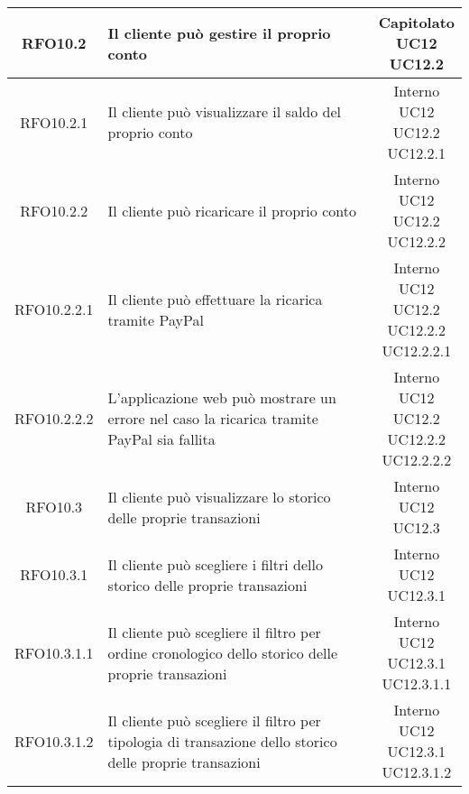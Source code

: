 \begin{longtable}{|c|p{8cm}|c|}
\hypertarget{RFO10.2}{RFO10.2} & Il cliente può gestire il proprio conto &\makecell*{Capitolato\\UC12\\UC12.2} \\
\hline

\hypertarget{RFO10.2.1}{RFO10.2.1} & Il cliente può visualizzare il saldo del proprio conto & \makecell*{Interno\\UC12\\UC12.2\\UC12.2.1} \\
\hline
\hypertarget{RFO10.2.2}{RFO10.2.2} & Il cliente può ricaricare il proprio conto & \makecell*{Interno\\UC12\\UC12.2\\UC12.2.2} \\
\hline

\hypertarget{RFO10.2.2.1}{RFO10.2.2.1} & Il cliente può effettuare la ricarica tramite PayPal & \makecell*{Interno\\UC12\\UC12.2\\UC12.2.2\\UC12.2.2.1} \\
\hline

\hypertarget{RFO10.2.2.2}{RFO10.2.2.2} & L'applicazione web può mostrare un errore nel caso la ricarica tramite PayPal sia fallita & \makecell*{Interno\\UC12\\UC12.2\\UC12.2.2\\UC12.2.2.2} \\
\hline

\hypertarget{RFO10.3}{RFO10.3} & Il cliente può visualizzare lo storico delle proprie transazioni & \makecell*{Interno\\UC12\\UC12.3} \\
\hline

\hypertarget{RFO10.3.1}{RFO10.3.1} & Il cliente può scegliere i filtri dello storico delle proprie transazioni & \makecell*{Interno\\UC12\\UC12.3.1} \\
\hline

\hypertarget{RFO10.3.1.1}{RFO10.3.1.1} & Il cliente può scegliere il filtro per ordine cronologico dello storico delle proprie transazioni & \makecell*{Interno\\UC12\\UC12.3.1\\UC12.3.1.1} \\
\hline
\hypertarget{RFO10.3.1.2}{RFO10.3.1.2} & Il cliente può scegliere il filtro per tipologia di transazione dello storico delle proprie transazioni & \makecell*{Interno\\UC12\\UC12.3.1\\UC12.3.1.2} \\
\hline


\end{longtable}
